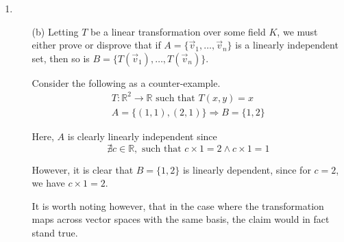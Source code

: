 \documentclass{article}
\newenvironment{answers}{ %
	\begin{enumerate}
		\setlength{\itemsep}{\bigskipamount}
}{\end{enumerate}}
\newcommand{\R}{\mathbb{R}}
\newcommand{\st}{\text{ such that }}
\begin{document}
\begin{answers}
\begin{enumerate}
				By applying the transformation to each \((x,y)\), it simply makes \(x\) into \(y\) and vice versa. Therefore the images \(L'_1\) and \(L'_2\) of \(L_1\) and \(L_2\) respectively are the following.
				\begin{gather*}
					L'_1 = \{(x,y) : x - y = 0\} \\
					L'_2 = \{(x,y) : y + 3x = 0\}
				\end{gather*}
		\end{enumerate}

	\item
		\begin{enumerate}
			\item[(b)]
				Letting \(T\) be a linear transformation over some field \(K\), we must either prove or disprove that if \(A = \{\vec{v}_1,\dots,\vec{v}_n\}\) is a linearly independent set, then so is \(B = \{T(\vec{v}_1),\dots,T(\vec{v}_n)\}\).

				Consider the following as a counter-example.
				\begin{gather*}
					T: \R^2 \to \R \st T(x, y) = x \\
					A = \{(1, 1), (2, 1)\} \Rightarrow B = \{1, 2\}
				\end{gather*}

				Here, \(A\) is clearly linearly independent since
				\begin{equation*}
					\nexists c \in \R,\st c \times 1 = 2 \land c \times 1 = 1
				\end{equation*}

				However, it is clear that \(B = \{1, 2\}\) is linearly dependent, since for \(c = 2\), we have \(c \times 1 = 2\).

				It is worth noting however, that in the case where the transformation maps across vector spaces with the same basis, the claim would in fact stand true.
		\end{enumerate}

\end{answers}
\end{document}
